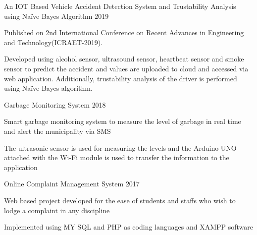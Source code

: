 


\begin{cventries}


\cventry
{} %
{An IOT Based Vehicle Accident Detection System and Trustability Analysis using Naïve Bayes  Algorithm} %
{} %
{2019} %
{ %
\begin{cvitems}
\item {Published on 2nd International Conference on Recent Advances in Engineering and Technology(ICRAET-2019).}
\item {Developed using alcohol sensor, ultrasound sensor, heartbeat sensor and smoke sensor to predict the accident and values are uploaded to cloud and accessed via web application. Additionally, trustability analysis of the driver is performed using Naïve Bayes algorithm.}
\end{cvitems}
}


\cventry
{} %
{Garbage Monitoring System} %
{} %
{2018} %
{ %
\begin{cvitems}
\item {Smart garbage monitoring system to measure the level of garbage in real time and alert the municipality via SMS}
\item {The ultrasonic sensor is used for measuring the levels and the Arduino UNO attached with the Wi-Fi module is used to transfer the information to the application}
\end{cvitems}
}

\cventry
{} %
{Online Complaint Management System} %
{} %
{2017} %
{ %
\begin{cvitems}
\item {Web based project developed for the ease of students and staffs who wish to lodge a complaint in any discipline}
\item {Implemented using MY SQL and PHP as coding languages and XAMPP software}
\end{cvitems}
}



\end{cventries}

